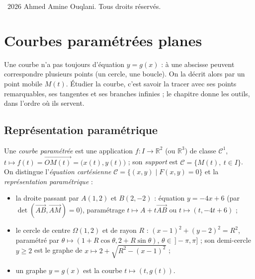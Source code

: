 \documentclass[a4paper,11pt]{article}
\numberwithin{equation}{section}
\numberwithin{figure}{section}
\numberwithin{table}{section}
\theoremstyle{enonce}
\theoremstyle{exemple}
\theoremstyle{remarque}
\newcommand{\R}{\mathbb{R}}
\newcommand{\vv}[1]{\overrightarrow{#1}}
\newif\ifonglets \ongletsfalse
\begin{document}
\vfill
{\footnotesize\sffamily\color{Gris}\textcopyright~2026 Ahmed Amine Ouqlani. Tous droits réservés.\par}

\clearpage
\thispagestyle{plain}
\hypertarget{toc}{}
\renewcommand{\contentsname}{Sommaire}
\tableofcontents
\clearpage
{}
\ongletstrue
\setcounter{section}{1}
\clearpage
\section{Courbes paramétrées planes}\label{sec:courbes}

Une courbe n'a pas toujours d'équation $y=g(x)$ : à une abscisse peuvent correspondre plusieurs points (un cercle, une
boucle). On la décrit alors par un point mobile $M(t)$. Étudier la courbe, c'est savoir la tracer avec ses points
remarquables, ses tangentes et ses branches infinies ; le chapitre donne les outils, dans l'ordre où ils servent.

\subsection{Représentation paramétrique}

Une \emph{courbe paramétrée} est une application $f:I\to\R^2$ (ou $\R^3$) de classe $\mathcal C^1$,
$t\mapsto f(t)=\vv{OM(t)}=\big(x(t),y(t)\big)$ ; son \emph{support} est $\mathcal C=\{M(t),\ t\in I\}$. On distingue
l'\emph{équation cartésienne} $\mathcal C=\{(x,y)\mid F(x,y)=0\}$ et la \emph{représentation paramétrique} :
\begin{itemize}
\item la droite passant par $A(1,2)$ et $B(2,-2)$ : équation $y=-4x+6$ (par $\det(\vv{AB},\vv{AM})=0$), paramétrage
      $t\mapsto A+t\vv{AB}$ ou $t\mapsto(t,-4t+6)$ ;
\item le cercle de centre $\Omega(1,2)$ et de rayon $R$ : $(x-1)^2+(y-2)^2=R^2$, paramétré par
      $\theta\mapsto(1+R\cos\theta,2+R\sin\theta)$, $\theta\in\,]-\pi,\pi]$ ; son demi-cercle $y\geq2$ est le graphe de
      $x\mapsto2+\sqrt{R^2-(x-1)^2}$ ;
\item un graphe $y=g(x)$ est la courbe $t\mapsto(t,g(t))$.
\end{itemize}
\end{document}

